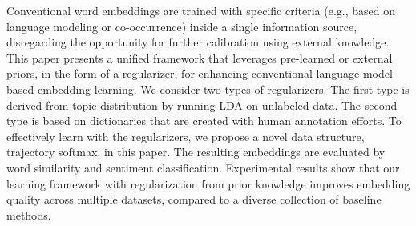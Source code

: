 Conventional word embeddings are trained with specific criteria (e.g., based on language modeling or co-occurrence) inside a single information source, disregarding the opportunity for further calibration using external knowledge. This paper presents a unified framework that leverages pre-learned or external priors, in the form of a regularizer, for enhancing conventional language model-based embedding learning. We consider two types of regularizers. The first type is derived from topic distribution by running LDA on unlabeled data. The second type is based on dictionaries that are created with human annotation efforts. To effectively learn with the regularizers, we propose a novel data structure, trajectory softmax, in this paper. The resulting embeddings are evaluated by word similarity and sentiment classification. Experimental results show that our learning framework with regularization from prior knowledge improves embedding quality across multiple datasets, compared to a diverse collection of baseline methods.
